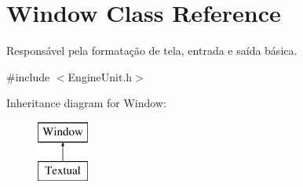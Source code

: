\hypertarget{classWindow}{\section{Window Class Reference}
\label{dc/dc4/classWindow}
}


Responsável pela formatação de tela, entrada e saída básica.  




{\ttfamily \#include $<$Engine\-Unit.\-h$>$}

Inheritance diagram for Window\-:\begin{figure}[H]
\begin{center}
\leavevmode
\includegraphics[height=2.000000cm]{dc/dc4/classWindow}
\end{center}
\end{figure}
